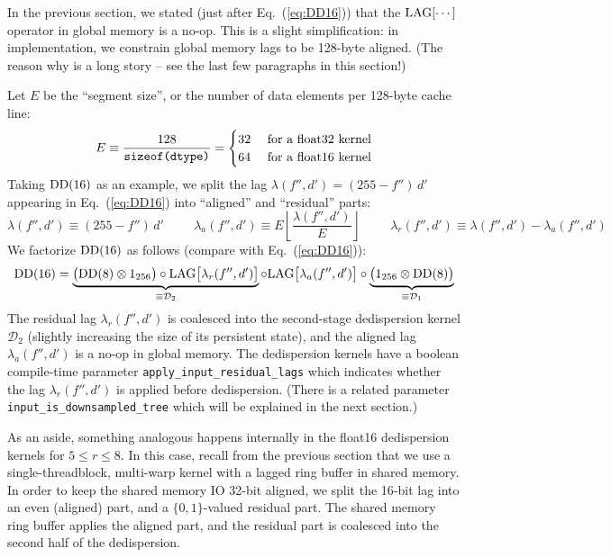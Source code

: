 \documentclass{article}
\numberwithin{equation}{section}   %
\def\DD{{\rm DD}}
\def\LAG{{\rm LAG}}
\begin{document}
In the previous section, we stated (just after Eq.\ (\ref{eq:DD16})) that the $\LAG[\cdots]$
operator in global memory is a no-op.
This is a slight simplification: in implementation, we constrain global memory lags to be
128-byte aligned.
(The reason why is a long story -- see the last few paragraphs in this section!)

Let $E$ be the ``segment size'', or the number of data elements per 128-byte cache line:
\begin{equation}
E \equiv \frac{128}{\mbox{\tt sizeof(dtype)}} = \begin{cases}
 32 & \mbox{ for a float32 kernel} \\
 64 & \mbox{ for a float16 kernel}
\end{cases}
\end{equation}
Taking $\DD(16)$ as an example, we split the lag $\lambda(f'',d') = (255-f'') \, d'$ 
appearing in Eq.\ (\ref{eq:DD16}) into ``aligned'' and ``residual'' parts:
\begin{equation}
\lambda(f'',d') \equiv (255-f'') \, d'
  \hspace{1cm}
\lambda_a(f'',d') \equiv E \left\lfloor \frac{\lambda(f'',d')}{E} \right\rfloor
  \hspace{1cm}
\lambda_r(f'',d') \equiv \lambda(f'',d') - \lambda_a(f'',d')
\label{eq:DD16_align}
\end{equation}
We factorize $\DD(16)$ as follows (compare with Eq.\ (\ref{eq:DD16})):
\begin{equation}
\DD(16) =
\underbrace{\big( \DD(8) \otimes 1_{256} \big) 
            \circ \LAG\big[ \lambda_r(f'',d') \big] }_{\equiv {\mathcal D}_2}
   \circ \LAG\big[ \lambda_a(f'',d') \big]
   \circ \underbrace{\big( 1_{256} \otimes \DD(8) \big)}_{\equiv {\mathcal D}_1}
\label{eq:DD16b}
\end{equation}
The residual lag $\lambda_r(f'',d')$ is coalesced into the second-stage
dedispersion kernel ${\mathcal D}_2$ (slightly increasing the size of its persistent
state), and the aligned lag $\lambda_a(f'',d')$ is a no-op in global memory.
The dedispersion kernels have a boolean compile-time parameter \verb|apply_input_residual_lags|
which indicates whether the lag $\lambda_r(f'',d')$ is applied before dedispersion.
(There is a related parameter \verb|input_is_downsampled_tree| which will be explained in
the next section.)

As an aside, something analogous happens internally in the float16 dedispersion
kernels for $5 \le r \le 8$. In this case, recall from the previous section that
we use a single-threadblock, multi-warp kernel with a lagged ring buffer in shared
memory. In order to keep the shared memory IO 32-bit aligned, we split the 16-bit
lag into an even (aligned) part, and a $\{0,1\}$-valued residual part. The shared
memory ring buffer applies the aligned part, and the residual part is coalesced into
the second half of the dedispersion.
\end{document}
